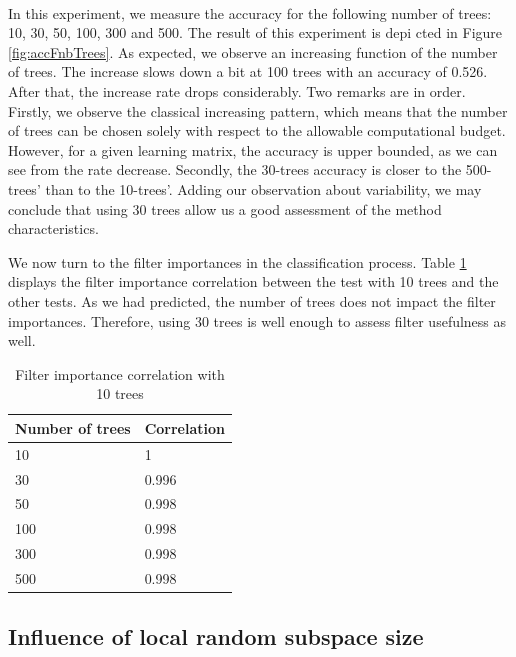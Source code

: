 \documentclass[a4paper]{report}
\begin{document}
		\paragraph{}
		In this experiment, we measure the accuracy for the following number of trees: 10, 30, 50, 100, 300 and 500. 
		The result of this experiment is depi	cted in Figure \ref{fig:accFnbTrees}. As expected, we observe an increasing function of the number of trees. The increase slows down a bit at 100 trees with an accuracy of 0.526. After that, the increase rate drops considerably. Two remarks are in order. Firstly, we observe the classical increasing pattern, which means that the number of trees can be chosen solely with respect to the allowable computational budget. However, for a given learning matrix, the accuracy is upper bounded, as we can see from the rate decrease. Secondly, the 30-trees accuracy is closer to the 500-trees' than to the 10-trees'. Adding our observation about variability, we may conclude that using 30 trees allow us a good assessment of the method characteristics. 

		\par
		We now turn to the filter importances in the classification process. Table \ref{tab:CorrVecNbTrees} displays the filter importance correlation between the test with 10 trees and the other tests. As we had predicted, the number of trees does not impact the filter importances. Therefore, using 30 trees is well enough to assess filter usefulness as well.
		
		\begin{table}
			\centering
				\begin{tabular}{l|l}
				\hline
				Number of trees & Correlation \\
				\hline \hline
				10 & 1 \\
				30 & 0.996 \\
				50 & 0.998 \\
				100 & 0.998 \\
				300 & 0.998 \\
				500 & 0.998 \\
				\hline
				\end{tabular}
			\caption{\label{tab:CorrVecNbTrees}Filter importance correlation with 10 trees}
		\end{table}
		
		
		
		
		
		\subsection{Influence of local random subspace size}
		
\end{document}
